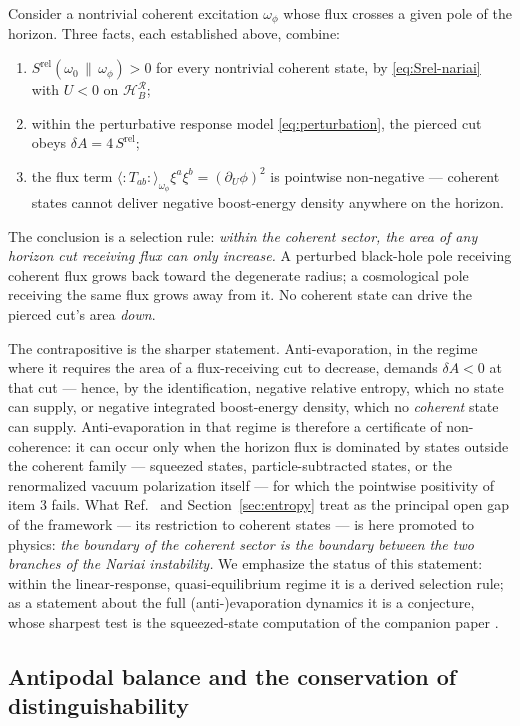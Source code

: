 \documentclass[11pt]{article}
\newcommand{\Srel}{S^{\mathrm{rel}}}
\newcommand{\Nariai}{Nariai}
\begin{document}
Consider a nontrivial coherent excitation $\omega_\phi$ whose flux crosses a given pole of the horizon. Three facts, each established above, combine:
\begin{enumerate}
\item $\Srel(\omega_0\,\|\,\omega_\phi) > 0$ for every nontrivial coherent state, by \eqref{eq:Srel-nariai} with $U<0$ on $\mathcal{H}_B^{\mathcal{R}}$;
\item within the perturbative response model \eqref{eq:perturbation}, the pierced cut obeys $\delta A = 4\,\Srel$;
\item the flux term $\langle{:}T_{ab}{:}\rangle_{\omega_\phi}\xi^a\xi^b = (\partial_U\phi)^2$ is pointwise non-negative --- coherent states cannot deliver negative boost-energy density anywhere on the horizon.
\end{enumerate}
The conclusion is a selection rule: \emph{within the coherent sector, the area of any horizon cut receiving flux can only increase.} A perturbed black-hole pole receiving coherent flux grows back toward the degenerate radius; a cosmological pole receiving the same flux grows away from it. No coherent state can drive the pierced cut's area \emph{down}.

The contrapositive is the sharper statement. Anti-evaporation, in the regime where it requires the area of a flux-receiving cut to decrease, demands $\delta A < 0$ at that cut --- hence, by the identification, negative relative entropy, which no state can supply, or negative integrated boost-energy density, which no \emph{coherent} state can supply. Anti-evaporation in that regime is therefore a certificate of non-coherence: it can occur only when the horizon flux is dominated by states outside the coherent family --- squeezed states, particle-subtracted states, or the renormalized vacuum polarization itself --- for which the pointwise positivity of item 3 fails. What Ref.~\cite{DorauMuch} and Section~\ref{sec:entropy} treat as the principal open gap of the framework --- its restriction to coherent states --- is here promoted to physics: \emph{the boundary of the coherent sector is the boundary between the two branches of the \Nariai{} instability.} We emphasize the status of this statement: within the linear-response, quasi-equilibrium regime it is a derived selection rule; as a statement about the full (anti-)evaporation dynamics it is a conjecture, whose sharpest test is the squeezed-state computation of the companion paper \cite{SuppNariai}.

\subsection{Antipodal balance and the conservation of distinguishability}
\end{document}
